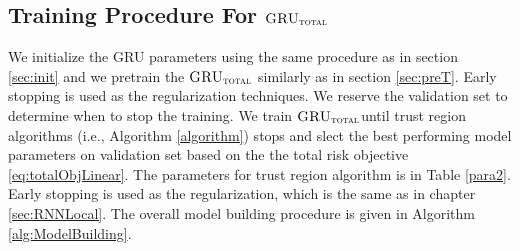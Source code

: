 \documentclass[letterpaper,12pt,titlepage,oneside,final]{book}
\numberwithin{equation}{section}
\theoremstyle{definition}
\newcommand{\model}{\textsc{GRU}_\delta}
\newcommand{\modelT}{\textsc{GRU}_{\textsc{total}}}
\newcommand{\modelL}{\textsc{GRU}_{\textsc{total}}^{\textsc{local}}}
\newcommand{\DS}{\Delta S}
\newcommand{\DT}{\Delta t}
\newcommand{\Smkt}{S}
\begin{document}
%
%

\subsection{Training Procedure For $\modelT$}
\label{sec:TotalModelProcedure}
We  initialize the  GRU parameters using the same procedure as in section \ref{sec:init} and we pretrain the $\modelT$ similarly as in section \ref{sec:preT}. Early stopping is used as the regularization techniques. We reserve the validation set to determine when to stop the training. 
We train $\modelT$until trust region algorithms (i.e., Algorithm \ref{algorithm}) stops and slect the best performing model parameters on validation set based on  the the total risk objective \eqref{eq:totalObjLinear}. The  parameters for trust region algorithm is in Table \ref{para2}. Early stopping is used as the regularization, which is the same as in chapter \ref{sec:RNNLocal}. The overall model building procedure is given in Algorithm \ref{alg:ModelBuilding}.
\end{document}
